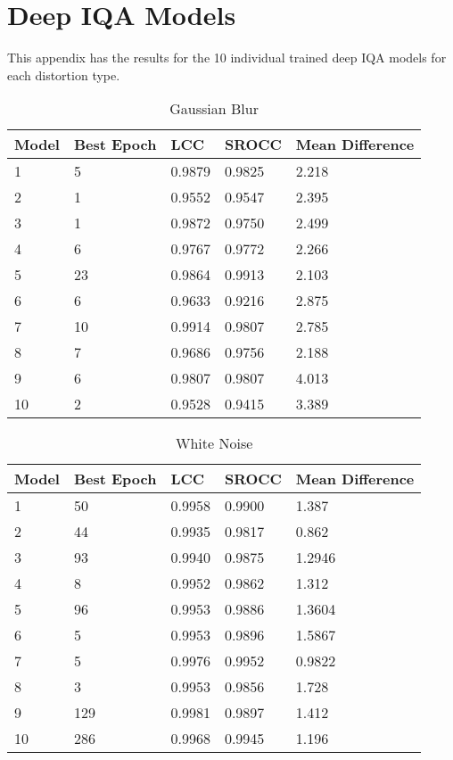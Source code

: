 \section{Deep IQA Models}
This appendix has the results for the 10 individual trained deep IQA models for each distortion type.

\begin{table}[!ht]
\centering
\caption{Gaussian Blur}
\label{my-label}
\begin{tabular}{|l|l|l|l|l|}
\hline
Model & Best Epoch & LCC    & SROCC  & Mean Difference \\ \hline
1     & 5          & 0.9879 & 0.9825 & 2.218           \\ \hline
2     & 1          & 0.9552 & 0.9547 & 2.395           \\ \hline
3     & 1          & 0.9872 & 0.9750 & 2.499           \\ \hline
4     & 6          & 0.9767 & 0.9772 & 2.266           \\ \hline
5     & 23         & 0.9864 & 0.9913 & 2.103           \\ \hline
6     & 6          & 0.9633 & 0.9216 & 2.875           \\ \hline
7     & 10         & 0.9914 & 0.9807 & 2.785           \\ \hline
8     & 7          & 0.9686 & 0.9756 & 2.188           \\ \hline
9     & 6          & 0.9807 & 0.9807 & 4.013           \\ \hline
10    & 2          & 0.9528 & 0.9415 & 3.389           \\ \hline
\end{tabular}
\end{table}

\begin{table}[!ht]
\centering
\caption{White Noise}
\label{my-label}
\begin{tabular}{|l|l|l|l|l|}
\hline
Model & Best Epoch & LCC    & SROCC  & Mean Difference \\ \hline
1     & 50         & 0.9958 & 0.9900 & 1.387           \\ \hline
2     & 44         & 0.9935 & 0.9817 & 0.862           \\ \hline
3     & 93         & 0.9940 & 0.9875 & 1.2946          \\ \hline
4     & 8          & 0.9952 & 0.9862 & 1.312           \\ \hline
5     & 96         & 0.9953 & 0.9886 & 1.3604          \\ \hline
6     & 5          & 0.9953 & 0.9896 & 1.5867          \\ \hline
7     & 5          & 0.9976 & 0.9952 & 0.9822          \\ \hline
8     & 3          & 0.9953 & 0.9856 & 1.728           \\ \hline
9     & 129        & 0.9981 & 0.9897 & 1.412           \\ \hline
10    & 286        & 0.9968 & 0.9945 & 1.196           \\ \hline
\end{tabular}
\end{table}

